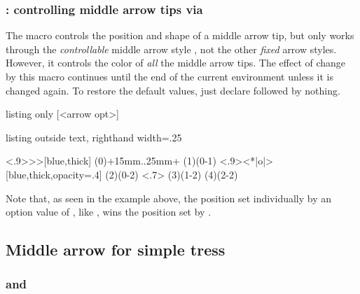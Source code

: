 \subsubsection{\protect\cmd{\setxtarrowtips}: controlling middle arrow tips via \xw{->-}}
\label{ssec:setxtarrowtips}

The macro \icmd{\setxtarrowtips} controls the position and shape of a middle arrow tip, 
but only works through the \emph{controllable} middle arrow style \xw{->-}, not the other \emph{fixed} arrow styles.
However, it controls the color of \emph{all} the middle arrow tips. The effect of change by this macro continues until the end of the current environment unless it is changed again. To restore the default values, just declare \cmd{\setxtarrowtips} followed by nothing.

\begin{tcblisting}{listing only}
  [<arrow opt>]
\end{tcblisting}

\begin{tcblisting}{listing outside text, righthand width=.25\linewidth}
\begin{istgame}[scale=1]
\setxtarrowtips<.9>{>>}[blue,thick]
\istroot(0)+15mm..25mm+
  \istb[->-] \istb[->-] \endist
\istroot(1)(0-1)
  \istb[->-=.5] \istb[->-=.3] \endist
\setxtarrowtips<.9>{<*|o|>}[blue,thick,opacity=.4]
\istroot(2)(0-2)
  \istb[->-,green] \istb[->-,red] \endist
\setxtarrowtips<.7>
\istroot(3)(1-2)  \istb \istb[->-] \endist
\istroot(4)(2-2)  \istb[-o-] \istb[-x-] \endist
\end{istgame}
\end{tcblisting}

Note that, as seen in the example above, the position set individually by an option value of \cmd{\istb}, like \cmd{\istb[->-=.3]}, 
wins the position set by .


\subsection{Middle arrow for simple tress}

\subsubsection{\protect\cmd{\xtShowMidArrows} and \protect\cmd{\xtHideMidArrows}}

